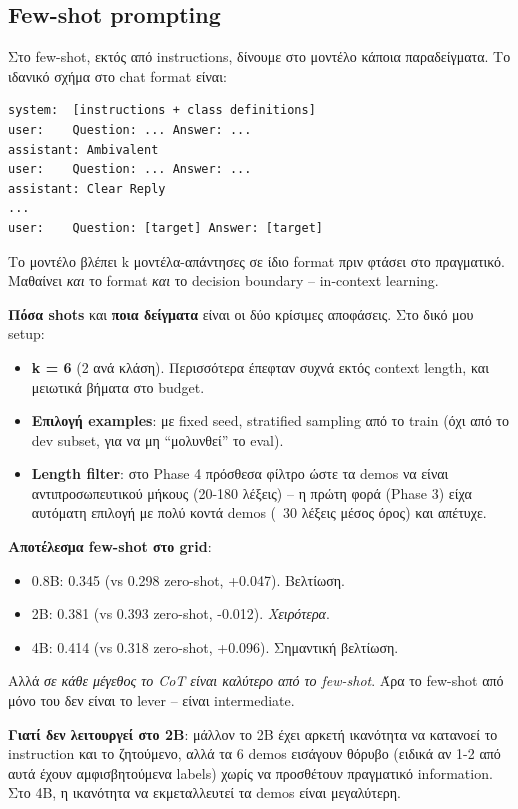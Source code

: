 \documentclass[12pt]{fphw}
\begin{document}
\subsection{Few-shot prompting}

Στο few-shot, εκτός από instructions, δίνουμε στο μοντέλο κάποια παραδείγματα. Το ιδανικό σχήμα στο chat format είναι:

\begin{verbatim}
system:  [instructions + class definitions]
user:    Question: ... Answer: ...
assistant: Ambivalent
user:    Question: ... Answer: ...
assistant: Clear Reply
...
user:    Question: [target] Answer: [target]
\end{verbatim}

Το μοντέλο βλέπει k μοντέλα-απάντησες σε ίδιο format πριν φτάσει στο πραγματικό. Μαθαίνει \emph{και} το format \emph{και} το decision boundary -- in-context learning.

\textbf{Πόσα shots} και \textbf{ποια δείγματα} είναι οι δύο κρίσιμες αποφάσεις. Στο δικό μου setup:

\begin{itemize}
    \item \textbf{k = 6} (2 ανά κλάση). Περισσότερα έπεφταν συχνά εκτός context length, και μειωτικά βήματα στο budget.
    \item \textbf{Επιλογή examples}: με fixed seed, stratified sampling από το train (όχι από το dev subset, για να μη ``μολυνθεί'' το eval).
    \item \textbf{Length filter}: στο Phase 4 πρόσθεσα φίλτρο ώστε τα demos να είναι αντιπροσωπευτικού μήκους (20-180 λέξεις) -- η πρώτη φορά (Phase 3) είχα αυτόματη επιλογή με πολύ κοντά demos (~30 λέξεις μέσος όρος) και απέτυχε.
\end{itemize}

\textbf{Αποτέλεσμα few-shot στο grid}:

\begin{itemize}
    \item 0.8B: 0.345 (vs 0.298 zero-shot, +0.047). Βελτίωση.
    \item 2B: 0.381 (vs 0.393 zero-shot, -0.012). \emph{Χειρότερα}.
    \item 4B: 0.414 (vs 0.318 zero-shot, +0.096). Σημαντική βελτίωση.
\end{itemize}

Αλλά \emph{σε κάθε μέγεθος το CoT είναι καλύτερο από το few-shot}. Άρα το few-shot από μόνο του δεν είναι το lever -- είναι intermediate.

\textbf{Γιατί δεν λειτουργεί στο 2B}: μάλλον το 2B έχει αρκετή ικανότητα να κατανοεί το instruction και το ζητούμενο, αλλά τα 6 demos εισάγουν θόρυβο (ειδικά αν 1-2 από αυτά έχουν αμφισβητούμενα labels) χωρίς να προσθέτουν πραγματικό information. Στο 4B, η ικανότητα να εκμεταλλευτεί τα demos είναι μεγαλύτερη.
\end{document}
